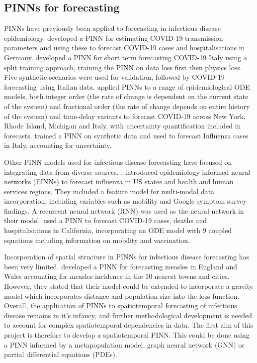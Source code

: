 \documentclass{article}
\begin{document}
\subsection{PINNs for forecasting}
PINNs have previously been applied to forecasting in infectious disease epidemiology. \parencite{Berkhahn2022} developed a PINN for estimating COVID-19 transmission parameters and using these to forecast COVID-19 cases and hospitalisations in Germany. \parencite{Millevoi2024} developed a PINN for short term forecasting COVID-19 Italy using a split training approach, training the PINN on data loss first then physics loss. Five synthetic scenarios were used for validation, followed by COVID-19 forecasting using Italian data. \parencite{Kharazmi2021} applied PINNs to a range of epidemiological ODE models, both integer order (the rate of change is dependent on the current state of the system) and fractional order (the rate of change depends on entire history of the system) and time-delay variants to forecast COVID-19 across New York, Rhode Island, Michigan and Italy, with uncertainty quantification included in forecasts. \parencite{https://doi.org/10.48550/arxiv.2506.03897} trained a PINN on synthetic data and used to forecast Influenza cases in Italy, accounting for uncertainty. 

Other PINN models used for infectious disease forecasting have focused on integrating data from diverse sources. \parencite{https://doi.org/10.48550/arxiv.2202.10446}, introduced epidemiology informed neural networks (EINNs) to forecast influenza in US states and health and human services regions. They included a feature model for multi-modal data incorporation, including variables such as mobility and Google symptom survey findings. A recurrent neural network (RNN) was used as the neural network in their model. \parencite{Qian2025} used a PINN to forecast COVID-19 cases, deaths and hospitalisations in California, incorporating an ODE model with 9 coupled equations including information on mobility and vaccination.

Incorporation of spatial structure in PINNs for infectious disease forecasting has been very limited. \parencite{Madden2024} developed a PINN for forecasting measles in England and Wales accounting for measles incidence in the 10 nearest towns and cities. However, they stated that their model could be extended to incorporate a gravity model which incorporates distance and population size into the loss function. Overall, the application of PINNs to spatiotemporal forecasting of infectious disease remains in it's infancy, and further methodological development is needed to account for complex spatiotemporal dependencies in data. The first aim of this project is therefore to develop a spatiotemporal PINN. This could be done using a PINN informed by a metapopulation model, graph neural network (GNN) or partial differential equations (PDEs). 
\end{document}
